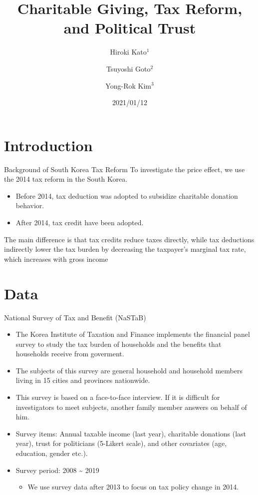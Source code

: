 \documentclass[
  ignorenonframetext,
]{beamer}
\title{Charitable Giving, Tax Reform, and Political Trust}
\author{Hiroki Kato\(^1\) \and Tsuyoshi Goto\(^2\) \and Yong-Rok
Kim\(^3\)}
\date{2021/01/12}
\institute{\(^1\)Osaka University \and \(^2\)Chiba
University \and \(^3\)Kobe University}
\providecommand{\tightlist}{%
  \setlength{\itemsep}{0pt}\setlength{\parskip}{0pt}}
\begin{document}
\frame{\titlepage}

\hypertarget{introduction}{%
\section{Introduction}\label{introduction}}

\begin{frame}{Background of South Korea Tax Reform}
\protect\hypertarget{background-of-south-korea-tax-reform}{}
To investigate the price effect, we use the 2014 tax reform in the South
Korea.

\begin{itemize}
\tightlist
\item
  Before 2014, tax deduction was adopted to subsidize charitable
  donation behavior.
\item
  After 2014, tax credit have been adopted.
\end{itemize}

The main difference is that tax credits reduce taxes directly, while tax
deductions indirectly lower the tax burden by decreasing the taxpayer's
marginal tax rate, which increases with gross income
\end{frame}

\hypertarget{data}{%
\section{Data}\label{data}}

\begin{frame}{National Survey of Tax and Benefit (NaSTaB)}
\protect\hypertarget{national-survey-of-tax-and-benefit-nastab}{}
\begin{itemize}
\tightlist
\item
  The Korea Institute of Taxation and Finance implements the financial
  panel survey to study the tax burden of households and the benefits
  that households receive from goverment.
\item
  The subjects of this survey are general household and household
  members living in 15 cities and provinces nationwide.
\item
  This survey is based on a face-to-face interview. If it is difficult
  for investigators to meet subjects, another family member answers on
  behalf of him.
\item
  Survey items: Annual taxable income (last year), charitable donations
  (last year), trust for politicians (5-Likert scale), and other
  covariates (age, education, gender etc.).
\item
  Survey period: 2008 \textasciitilde{} 2019

  \begin{itemize}
  \tightlist
  \item
    We use survey data after 2013 to focus on tax policy change in 2014.
  \end{itemize}
\end{itemize}
\end{frame}
\end{document}
